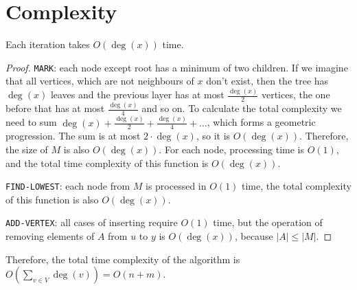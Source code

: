 \section{Complexity}
\begin{theorem}
    Each iteration takes $O(\deg(x))$ time.
\end{theorem}
\begin{proof}
\texttt{MARK}: each node except root has a minimum of two children. If we imagine that all vertices, which are not neighbours of $x$ don't exist, then the tree has $\deg(x)$ leaves and the previous layer has at most $\frac{\deg(x)}{2}$ vertices, the one before that has at most $\frac{\deg(x)}{4}$ and so on. To calculate the total complexity we need to sum $\deg(x) + \frac{\deg(x)}{2} + \frac{\deg(x)}{4} + \dots$, which forms a geometric progression. The sum is at most $2 \cdot \deg(x)$, so it is $O(\deg(x))$. Therefore, the size of $M$ is also $O(\deg(x))$. For each node, processing time is $O(1)$, and the total time complexity of this function is $O(\deg(x))$.

\texttt{FIND-LOWEST}: each node from $M$ is processed in $O(1)$ time, the total complexity of this function is also $O(\deg(x))$.

\texttt{ADD-VERTEX}: all cases of inserting require $O(1)$ time, but the operation of removing elements of $A$ from $u$ to $y$ is $O(\deg(x))$, because $|A| \leq |M|$. 

\end{proof}
Therefore, the total time complexity of the algorithm is $O( \sum\limits_{v \in V}^{} \deg(v)) = O(n+m)$.
